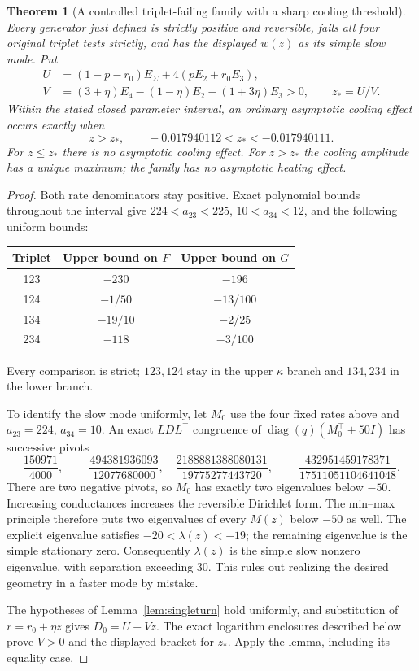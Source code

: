 \documentclass[11pt]{article}
\newtheorem{theorem}{Theorem}
\newcommand{\diag}{\operatorname{diag}}
\begin{document}
\begin{theorem}[A controlled triplet-failing family with a sharp cooling threshold]\label{thm:family}
Every generator just defined is strictly positive and reversible, fails all four original triplet tests strictly, and has the displayed $w(z)$ as its simple slow mode. Put
\begin{align*}
U&=(1-p-r_0)E_\Sigma+4(pE_2+r_0E_3),\\
V&=(3+\eta)E_4-(1-\eta)E_2-(1+3\eta)E_3>0,\qquad z_*=U/V.
\end{align*}
Within the stated closed parameter interval, an ordinary asymptotic cooling effect occurs exactly when
\[
\boxed{z>z_*,\qquad -0.017940112<z_*<-0.017940111.}
\]
For $z\leq z_*$ there is no asymptotic cooling effect. For $z>z_*$ the cooling amplitude has a unique maximum; the family has no asymptotic heating effect.
\end{theorem}
\begin{proof}
Both rate denominators stay positive. Exact polynomial bounds throughout the interval give $224<a_{23}<225$, $10<a_{34}<12$, and the following uniform bounds:
\begin{center}
\begin{tabular}{ccc}
\toprule Triplet&Upper bound on $F$&Upper bound on $G$\\\midrule
123&$-230$&$-196$\\
124&$-1/50$&$-13/100$\\
134&$-19/10$&$-2/25$\\
234&$-118$&$-3/100$\\\bottomrule
\end{tabular}
\end{center}
Every comparison is strict; $123,124$ stay in the upper $\kappa$ branch and $134,234$ in the lower branch.

To identify the slow mode uniformly, let $M_0$ use the four fixed rates above and $a_{23}=224$, $a_{34}=10$. An exact $LDL^\top$ congruence of $\diag(q)(M_0^\top+50I)$ has successive pivots
\[
\frac{150971}{4000},\quad
-\frac{494381936093}{12077680000},\quad
\frac{2188881388080131}{19775277443720},\quad
-\frac{432951459178371}{17511051104641048}.
\]
There are two negative pivots, so $M_0$ has exactly two eigenvalues below $-50$. Increasing conductances increases the reversible Dirichlet form. The min--max principle therefore puts two eigenvalues of every $M(z)$ below $-50$ as well. The explicit eigenvalue satisfies $-20<\lambda(z)<-19$; the remaining eigenvalue is the simple stationary zero. Consequently $\lambda(z)$ is the simple slow nonzero eigenvalue, with separation exceeding 30. This rules out realizing the desired geometry in a faster mode by mistake.

The hypotheses of Lemma~\ref{lem:singleturn} hold uniformly, and substitution of $r=r_0+\eta z$ gives $D_0=U-Vz$. The exact logarithm enclosures described below prove $V>0$ and the displayed bracket for $z_*$. Apply the lemma, including its equality case.
\end{proof}
\end{document}
